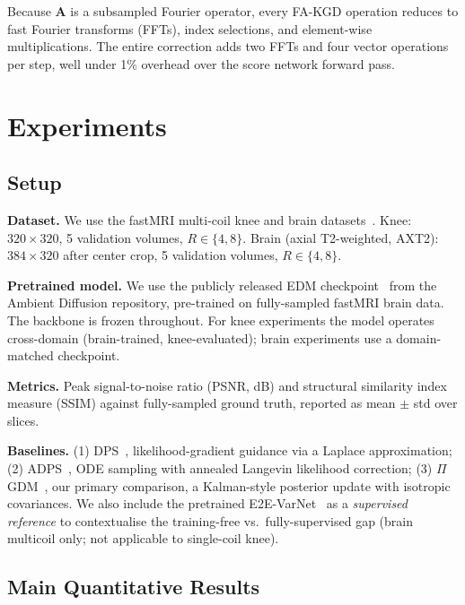 \documentclass[conference]{IEEEtran}
\begin{document}
Because $\mathbf{A}$ is a subsampled Fourier operator, every FA-KGD
operation reduces to fast Fourier transforms (FFTs), index selections, and
element-wise multiplications. The entire correction adds two FFTs and four
vector operations per step, well under 1\% overhead over the score
network forward pass.

\section{Experiments}
\label{sec:experiments}

\subsection{Setup}

\textbf{Dataset.} We use the fastMRI multi-coil knee and brain
datasets~\cite{zbontar2018fastmri}. Knee: $320 \times 320$, 5 validation
volumes, $R \in \{4, 8\}$. Brain (axial T2-weighted, AXT2): $384 \times 320$
after center crop,
5 validation volumes, $R \in \{4, 8\}$.

\textbf{Pretrained model.} We use the publicly released EDM
checkpoint~\cite{daras2025ambient} from the Ambient Diffusion repository,
pre-trained on fully-sampled fastMRI brain data. The backbone is frozen
throughout. For knee experiments the model operates cross-domain
(brain-trained, knee-evaluated); brain experiments use a domain-matched
checkpoint.

\textbf{Metrics.} Peak signal-to-noise ratio (PSNR, dB) and structural
similarity index measure (SSIM) against fully-sampled ground truth,
reported as mean $\pm$ std over slices.

\textbf{Baselines.} (1) DPS~\cite{chung2023dps}, likelihood-gradient
guidance via a Laplace approximation; (2) ADPS~\cite{daras2025ambient},
ODE sampling with annealed Langevin likelihood correction;
(3) $\Pi$GDM~\cite{song2023pigdm}, our primary comparison, a Kalman-style
posterior update with isotropic covariances. We also include the pretrained
E2E-VarNet~\cite{sriram2020varnet} as a \emph{supervised reference} to
contextualise the training-free vs.\ fully-supervised gap (brain multicoil
only; not applicable to single-coil knee).
\subsection{Main Quantitative Results}
\end{document}

